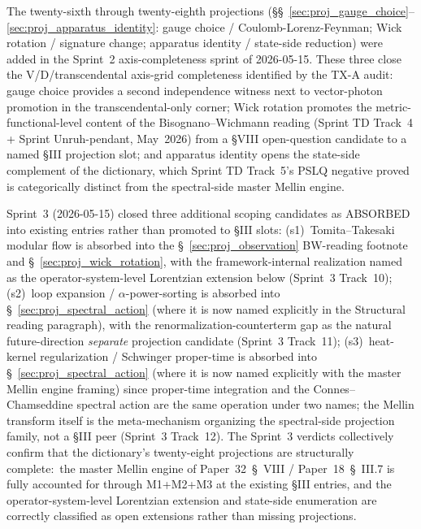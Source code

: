 \documentclass[11pt]{article}
\begin{document}
\begin{enumerate}
The twenty-sixth through twenty-eighth projections
(\S\S~\ref{sec:proj_gauge_choice}--\ref{sec:proj_apparatus_identity}:
gauge choice / Coulomb-Lorenz-Feynman; Wick rotation / signature
change; apparatus identity / state-side reduction) were added in the
Sprint~2 axis-completeness sprint of 2026-05-15.  These three close
the V/D/transcendental axis-grid completeness identified by the
TX-A audit: gauge choice provides a second independence witness next
to vector-photon promotion in the transcendental-only corner; Wick
rotation promotes the metric-functional-level content of the
Bisognano--Wichmann reading (Sprint TD Track~4 + Sprint Unruh-pendant,
May~2026) from a §VIII open-question candidate to a named §III
projection slot; and apparatus identity opens the state-side
complement of the dictionary, which Sprint TD Track~5's PSLQ negative
proved is categorically distinct from the spectral-side master Mellin
engine.

Sprint~3 (2026-05-15) closed three additional scoping candidates as
ABSORBED into existing entries rather than promoted to §III slots:
(s1)~Tomita--Takesaki modular flow is absorbed into the
\S~\ref{sec:proj_observation} BW-reading footnote and
\S~\ref{sec:proj_wick_rotation}, with the framework-internal realization
named as the operator-system-level Lorentzian extension below
(Sprint~3 Track~10);
(s2)~loop expansion / $\alpha$-power-sorting is absorbed into
\S~\ref{sec:proj_spectral_action} (where it is now named explicitly in
the Structural reading paragraph), with the renormalization-counterterm
gap as the natural future-direction \emph{separate} projection candidate
(Sprint~3 Track~11);
(s3)~heat-kernel regularization / Schwinger proper-time is absorbed into
\S~\ref{sec:proj_spectral_action} (where it is now named explicitly with
the master Mellin engine framing) since proper-time integration and the
Connes--Chamseddine spectral action are the same operation under two
names; the Mellin transform itself is the meta-mechanism organizing
the spectral-side projection family, not a §III peer (Sprint~3 Track~12).
The Sprint~3 verdicts collectively confirm that the dictionary's
twenty-eight projections are structurally complete:\ the master Mellin
engine of Paper~32~\S~VIII / Paper~18~\S~III.7 is fully accounted for
through M1+M2+M3 at the existing §III entries, and the
operator-system-level Lorentzian extension and state-side enumeration
are correctly classified as open extensions rather than missing
projections.


\end{enumerate}
\end{document}
